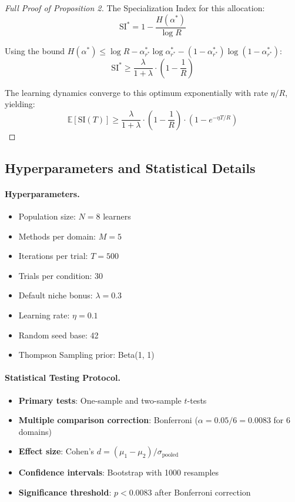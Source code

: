 \documentclass{article}
\newcommand{\SI}{\text{SI}}
\newcommand{\E}{\mathbb{E}}
\begin{document}
\begin{proof}[Full Proof of Proposition 2]
The Specialization Index for this allocation:
\begin{equation}
    \SI^* = 1 - \frac{H(\alpha^*)}{\log R}
\end{equation}

Using the bound $H(\alpha^*) \leq \log R - \alpha_{r^*}^* \log \alpha_{r^*}^* - (1 - \alpha_{r^*}^*) \log(1 - \alpha_{r^*}^*)$:
\begin{equation}
    \SI^* \geq \frac{\lambda}{1 + \lambda} \cdot \left(1 - \frac{1}{R}\right)
\end{equation}

The learning dynamics converge to this optimum exponentially with rate $\eta/R$, yielding:
\begin{equation}
    \E[\SI(T)] \geq \frac{\lambda}{1 + \lambda} \cdot \left(1 - \frac{1}{R}\right) \cdot \left(1 - e^{-\eta T / R}\right)
\end{equation}
\end{proof}

\subsection{Hyperparameters and Statistical Details}

\paragraph{Hyperparameters.}
\begin{itemize}
    \item Population size: $N = 8$ learners
    \item Methods per domain: $M = 5$
    \item Iterations per trial: $T = 500$
    \item Trials per condition: 30
    \item Default niche bonus: $\lambda = 0.3$
    \item Learning rate: $\eta = 0.1$
    \item Random seed base: 42
    \item Thompson Sampling prior: Beta(1, 1)
\end{itemize}

\paragraph{Statistical Testing Protocol.}
\begin{itemize}
    \item \textbf{Primary tests}: One-sample and two-sample $t$-tests
    \item \textbf{Multiple comparison correction}: Bonferroni ($\alpha = 0.05/6 = 0.0083$ for 6 domains)
    \item \textbf{Effect size}: Cohen's $d = (\mu_1 - \mu_2) / \sigma_{\text{pooled}}$
    \item \textbf{Confidence intervals}: Bootstrap with 1000 resamples
    \item \textbf{Significance threshold}: $p < 0.0083$ after Bonferroni correction
\end{itemize}
\end{document}
